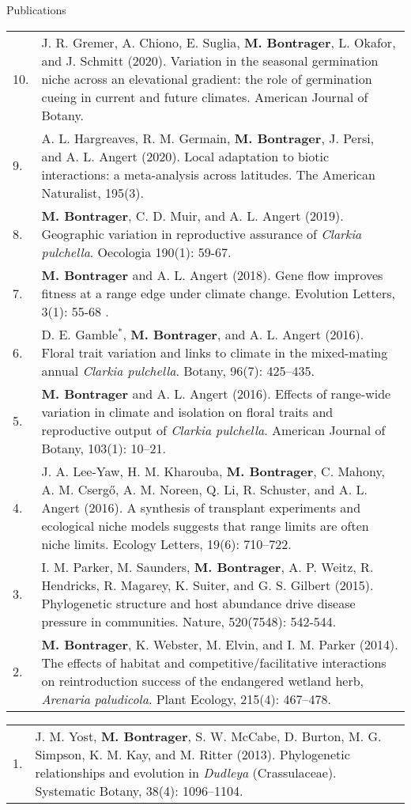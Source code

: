 \documentclass[letterpaper,11pt,oneside]{article}
\begin{document}
\bigskip
\bigskip

\bigskip
\bigskip


\bgroup
\noindent\Large{Publications}  
\normalsize
\bigskip

\def\arraystretch{1.2}
\noindent \begin{tabular}{@{} p{1cm} >{\raggedright\arraybackslash}p{15.11cm}}
10. & [in press] J. R. Gremer, A. Chiono, E. Suglia, \textbf{M. Bontrager}, L. Okafor, and J. Schmitt (2020). Variation in the seasonal germination niche across an elevational gradient: the role of germination cueing in current and future climates. American Journal of Botany. \\
9. & A. L. Hargreaves, R. M. Germain, \textbf{M. Bontrager}, J. Persi, and A. L. Angert (2020). Local adaptation to biotic interactions: a meta-analysis across latitudes. The American Naturalist, 195(3). \\
8. & \textbf{M. Bontrager}, C. D. Muir, and A. L. Angert (2019). Geographic variation in reproductive assurance of \textit{Clarkia pulchella}. Oecologia 190(1): 59-67. \\
7. & \textbf{M. Bontrager} and A. L. Angert (2018). Gene flow improves fitness at a range edge under climate change. Evolution Letters, 3(1): 55-68 . \\
6. & D. E. Gamble$^{*}$, \textbf{M. Bontrager}, and A. L. Angert (2016). Floral trait variation and links to climate in the mixed-mating annual \textit{Clarkia pulchella}. Botany, 96(7): 425–435. \\
5. & \textbf{M. Bontrager} and A. L. Angert (2016). Effects of range-wide variation in climate and isolation on floral traits and reproductive output of \textit{Clarkia pulchella}. American Journal of Botany, 103(1): 10–21.  \\
4. & J. A. Lee-Yaw, H. M. Kharouba, \textbf{M. Bontrager}, C. Mahony, A. M. Cserg{\H{o}}, A. M. Noreen, Q. Li, R. Schuster, and A. L. Angert (2016). A synthesis of transplant experiments and ecological niche models suggests that range limits are often niche limits. Ecology Letters, 19(6): 710–722. \\
3. & I. M. Parker, M. Saunders, \textbf{M. Bontrager}, A. P. Weitz, R. Hendricks, R. Magarey, K. Suiter, and G. S. Gilbert (2015). Phylogenetic structure and host abundance drive disease pressure in communities. Nature, 520(7548): 542-544. \\
2. & \textbf{M. Bontrager}, K. Webster, M. Elvin, and I. M. Parker (2014). The effects of habitat and competitive/facilitative interactions on reintroduction success of the endangered wetland herb, \textit{Arenaria paludicola}. Plant Ecology, 215(4): 467–478. \\
\end{tabular}
\def\arraystretch{1.2}
\noindent \begin{tabular}{@{} p{1cm} >{\raggedright\arraybackslash}p{15.11cm}}
1. & J. M. Yost, \textbf{M. Bontrager}, S. W. McCabe, D. Burton, M. G. Simpson, K. M. Kay, and M. Ritter (2013). Phylogenetic relationships and evolution in \textit{Dudleya} (Crassulaceae). Systematic Botany, 38(4): 1096–1104. \\
\end{tabular}
\end{document}
